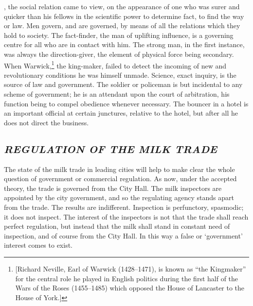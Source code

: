 \documentclass[openany,nobib]{tufte-book}
\begin{document}
\vspace{0.5in}

, the social relation came to view, on the appear­ance of
one who was surer and quicker than his fellows in the scientific power
to determine fact, to find the way or law. Men govern, and are governed,
by means of all the relations which they hold to society. The
fact-finder, the man of uplifting influence, is a governing centre for
all who are in contact with him. The strong man, in the first instance,
was always the direction-giver, the element of physical force being
secondary. When Warwick,\footnote{{[}Richard Neville, Earl of Warwick
  (1428--1471), is known as ``the Kingmaker'' for the central role he
  played in English politics during the first half of the Wars of the
  Roses (1455--1485) which opposed the House of Lancaster to the House
  of York.{]}} the king-maker, failed to detect the incoming of new and
revolutionary conditions he was himself unmade. Science, exact inquiry,
is the source of law and government. The soldier or po­liceman is but
incidental to any scheme of government; he is an attend­ant upon the
court of arbitration, his function being to compel obe­dience whenever
necessary. The bouncer in a hotel is an important of­ficial at certain
junctures, relative to the hotel, but after all he does not direct the
business.

\hypertarget{regulation-0f-the-milk-trade}{%
\subsection{\texorpdfstring{\emph{REGULATION OF THE MILK
TRADE}}{REGULATION 0F THE MILK TRADE}}\label{regulation-0f-the-milk-trade}}

The state of the milk trade in leading cities will help to make clear
the whole question of government or commercial regulation. As now, under
the accepted theory, the trade is governed from the City Hall. The milk
inspectors are appointed by the city government, and so the regulating
agency stands apart from the trade. The results are indifferent.
Inspection is perfunctory, spasmodic; it does not in­spect. The interest
of the inspectors is not that the trade shall reach perfect regulation,
but instead that the milk shall stand in con­stant need of inspection,
and of course from the City Hall. In this way a false or `government'
interest comes to exist.
\end{document}
